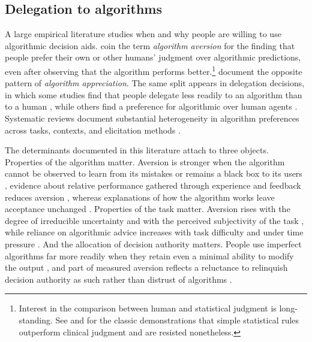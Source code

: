 \subsection*{Delegation to algorithms}

A large empirical literature studies when and why people are willing to use algorithmic decision aids. \citet{dietvorst_algorithm_2015} coin the term \textit{algorithm aversion} for the finding that people prefer their own or other humans' judgment over algorithmic predictions, even after observing that the algorithm performs better.\footnote{Interest in the comparison between human and statistical judgment is long-standing. See \citet{meehl_clinical_1954} and \citet{dawes_robust_1979} for the classic demonstrations that simple statistical rules outperform clinical judgment and are resisted nonetheless.} \citet{logg_algorithm_2019} document the opposite pattern of \textit{algorithm appreciation}. The same split appears in delegation decisions, in which some studies find that people delegate less readily to an algorithm than to a human \citep{dietvorst_algorithm_2015}, while others find a preference for algorithmic over human agents \citep{logg_algorithm_2019, candrian_rise_2022, germann_algorithm_2023, holzmeister_delegation_2023}. Systematic reviews document substantial heterogeneity in algorithm preferences across tasks, contexts, and elicitation methods \citep{burton_systematic_2020, mahmud_what_2022, chugunova_we_2022, qin_ai_2025, irlenbusch_human_2026}.

The determinants documented in this literature attach to three objects. Properties of the algorithm matter. Aversion is stronger when the algorithm cannot be observed to learn from its mistakes \citep{berger_watch_2021} or remains a black box to its users \citep{litterscheidt_financial_2020}, evidence about relative performance gathered through experience and feedback reduces aversion \citep{filiz_reducing_2021}, whereas explanations of how the algorithm works leave acceptance unchanged \citep{dargnies_aversion_2026}. Properties of the task matter. Aversion rises with the degree of irreducible uncertainty \citep{dietvorst_people_2020} and with the perceived subjectivity of the task \citep{castelo_task-dependent_2019}, while reliance on algorithmic advice increases with task difficulty \citep{bogert_humans_2021} and under time pressure \citep{jung_towards_2021}. And the allocation of decision authority matters. People use imperfect algorithms far more readily when they retain even a minimal ability to modify the output \citep{dietvorst_overcoming_2018, normann_delegate_2025}, and part of measured aversion reflects a reluctance to relinquish decision authority as such rather than distrust of algorithms \citep{ivanova_stenzel_delegating_2025, ivanova_stenzel_measuring_2024}.

